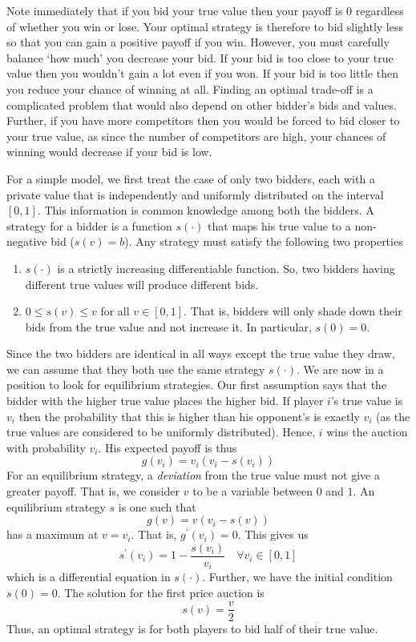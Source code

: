 \documentclass{article}
\theoremstyle{definition}
\begin{document}
Note immediately that if you bid your true value then your payoff is $0$ regardless of whether you win or lose. Your optimal strategy is therefore to bid slightly less so that you can gain a positive payoff if you win. However, you must carefully balance `how much' you decrease your bid. If your bid is too close to your true value then you wouldn't gain a lot even if you won. If your bid is too little then you reduce your chance of winning at all. Finding an optimal trade-off is a complicated problem that would also depend on other bidder's bids and values. Further, if you have more competitors then you would be forced to bid closer to your true value, as since the number of competitors are high, your chances of winning would decrease if your bid is low. \medskip

For a simple model, we first treat the case of only two bidders, each with a private value that is independently and uniformly distributed on the interval $[0,1]$. This information is common knowledge among both the bidders. A strategy for a bidder is a function $s(\cdot)$ that maps his true value to a non-negative bid ($s(v) = b$). Any strategy must satisfy the following two properties
\begin{enumerate}
    \item $s(\cdot)$ is a strictly increasing differentiable function. So, two bidders having different true values will produce different bids.
    \item $0 \leq s(v) \leq v$ for all $v \in [0,1]$. That is, bidders will only shade down their bids from the true value and not increase it. In particular, $s(0) = 0$.
\end{enumerate}

Since the two bidders are identical in all ways except the true value they draw, we can assume that they both use the same strategy $s(\cdot)$. We are now in a position to look for equilibrium strategies. Our first assumption says that the bidder with the higher true value places the higher bid. If player $i$'s true value is $v_i$ then the probability that this is higher than his opponent's is exactly $v_i$ (as the true values are considered to be uniformly distributed). Hence, $i$ wins the auction with probability $v_i$. His expected payoff is thus
\[
    g(v_i) = v_i \left( v_i - s(v_i) \right)
\]
For an equilibrium strategy, a \textit{deviation} from the true value must not give a greater payoff. That is, we consider $v$ to be a variable between $0$ and $1$. An equilibrium strategy $s$ is one such that
\[
    g(v) = v \left( v_i - s(v) \right)
\]
has a maximum at $v=v_i$. That is, $g^{\prime}(v_i) = 0$. This gives us
\[
    s^{\prime}(v_i) = 1 - \frac{s(v_i)}{v_i} \quad \forall v_i \in [0,1]
\]  
which is a differential equation in $s(\cdot)$. Further, we have the initial condition $s(0) = 0$. The solution for the first price auction is
\[
    s(v) = \frac{v}{2}
\]
Thus, an optimal strategy is for both players to bid half of their true value. \medskip
\end{document}
